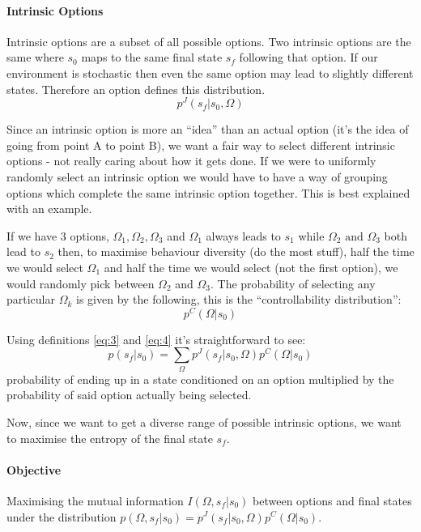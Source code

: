 \documentclass{article}
\begin{document}
\paragraph{Intrinsic Options} Intrinsic options are a subset of all possible options. Two intrinsic options are the same where \(s_{0}\) maps to the same final state \(s_{f}\) following that option. If our environment is stochastic then even the same option may lead to slightly different states. Therefore an option defines this distribution.
\begin{equation}
  \label{eq:3}
  p^{J}(s_{f}|s_{0}, \Omega)
\end{equation}

Since an intrinsic option is more an ``idea'' than an actual option (it's the idea of going from point A to point B), we want a fair way to select different intrinsic options - not really caring about how it gets done.
If we were to uniformly randomly select an intrinsic option we would have to have a way of grouping options which complete the same intrinsic option together. This is best explained with an example.


If we have 3 options, \(\Omega_{1}, \Omega_{2}, \Omega_{3}\) and \(\Omega_{1}\) always leads to \(s_{1}\) while \(\Omega_{2} \text{ and } \Omega_{3}\) both lead to \(s_{2}\) then, to maximise behaviour diversity (do the most stuff), half the time we would select \(\Omega_{1}\) and half the time we would select (not the first option), we would randomly pick between \(\Omega_{2}\) and \(\Omega_{3}\). The probability of selecting any particular \(\Omega_{k}\) is given by the following, this is the ``controllability distribution'':
\begin{equation}
  \label{eq:4}
  p^{C}(\Omega | s_{0})
  \end{equation}


  Using definitions \eqref{eq:3} and \eqref{eq:4} it's straightforward to see:
\begin{equation}
  \label{eq:5}
  p(s_{f}|s_{0}) = \sum_{\Omega} p^{J}(s_{f}|s_{0},\Omega) p^{C}(\Omega | s_{0})
\end{equation}
  probability of ending up in a state conditioned on an option multiplied by the probability of said option actually being selected.


  Now, since we want to get a diverse range of possible intrinsic options, we want to maximise the entropy of the final state \(s_{f}\).

  \paragraph{Objective} Maximising the mutual information \(I(\Omega, s_{f}| s_{0})\) between options and final states under the distribution \(p(\Omega,s_{f}|s_{0}) = p^{J}(s_{f}|s_{0}, \Omega)p^{C}(\Omega | s_{0})\).
\end{document}
